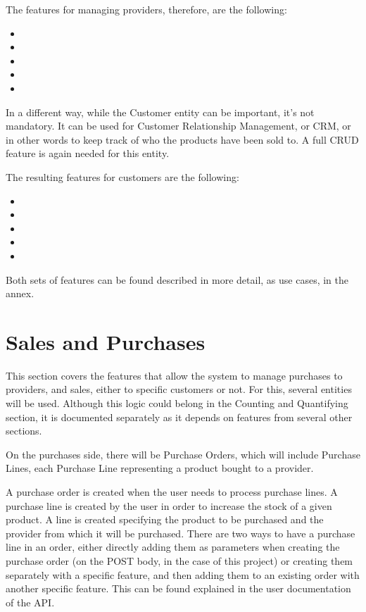 The features for managing providers, therefore, are the following:
\hfill\break
\begin{itemize}
\item {}
\item {}
\item {}
\item {}
\item {}
\end{itemize}
\hfill\break
In a different way, while the Customer entity can be important, it’s not mandatory. It can be used for Customer Relationship Management, or CRM, or in other words to keep track of who the products have been sold to. A full CRUD feature is again needed for this entity.

The resulting features for customers are the following:
\hfill\break
\begin{itemize}
\item {}
\item {}
\item {}
\item {}
\item {}
\end{itemize}
\hfill\break
Both sets of features can be found described in more detail, as use cases, in the annex.

\section{Sales and Purchases}
This section covers the features that allow the system to manage purchases to providers, and sales, either to specific customers or not. For this, several entities will be used. Although this logic could belong in the Counting and Quantifying section, it is documented separately as it depends on features from several other sections. 

On the purchases side, there will be Purchase Orders, which will include Purchase Lines, each Purchase Line representing a product bought to a provider.

A purchase order is created when the user needs to process purchase lines. A purchase line is created by the user in order to increase the stock of a given product. A line is created specifying the product to be purchased and the provider from which it will be purchased. There are two ways to have a purchase line in an order, either directly adding them as parameters when creating the purchase order (on the POST body, in the case of this project) or creating them separately with a specific feature, and then adding them to an existing order with another specific feature. This can be found explained in the user documentation of the API.

